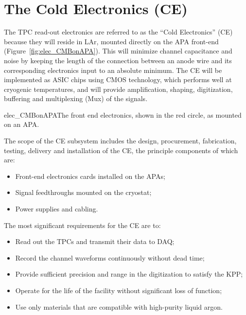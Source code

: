 \section{The Cold Electronics (CE)} 
\label{sec:detectors-fd-ref-ce}

The TPC read-out electronics are referred to as the ``Cold Electronics'' (CE) because they will reside in LAr,
mounted directly on the APA front-end (Figure~\ref{fig:elec_CMBonAPA}).
This will minimize channel capacitance and noise by keeping the length of the connection between an anode wire
and its corresponding electronics input to an absolute minimum.
The CE will be implemented as ASIC chips using CMOS technology,
which performs well at cryogenic temperatures,
and will provide amplification, shaping, digitization, buffering and multiplexing (Mux) of the signals.
\begin{cdrfigure}{elec_CMBonAPA}{The front end electronics,
shown in the red circle, as mounted on an APA.}
\end{cdrfigure}

The scope of the CE subsystem includes the design, procurement, fabrication, testing,
delivery and installation of the CE, the principle components of which are:
\begin{itemize}
\item Front-end electronics cards installed on the APAs;
\item Signal feedthroughs mounted on the cryostat;
\item Power supplies and cabling.
\end{itemize}
The most significant requirements for the CE are to:
\begin{itemize}	
\item Read out the TPCs and transmit their data to DAQ;
\item Record the channel waveforms continuously without dead time;
\item Provide sufficient precision and range in the digitization to satisfy the KPP;
\item Operate for the life of the facility without significant loss of function;
\item Use only materials that are compatible with high-purity liquid argon.
\end{itemize}

